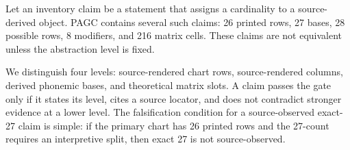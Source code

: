 Let an inventory claim be a statement that assigns a cardinality to a source-derived object. PAGC contains several such claims: 26 printed rows, 27 bases, 28 possible rows, 8 modifiers, and 216 matrix cells. These claims are not equivalent unless the abstraction level is fixed.

We distinguish four levels: source-rendered chart rows, source-rendered columns, derived phonemic bases, and theoretical matrix slots. A claim passes the gate only if it states its level, cites a source locator, and does not contradict stronger evidence at a lower level. The falsification condition for a source-observed exact-27 claim is simple: if the primary chart has 26 printed rows and the 27-count requires an interpretive split, then exact 27 is not source-observed.
